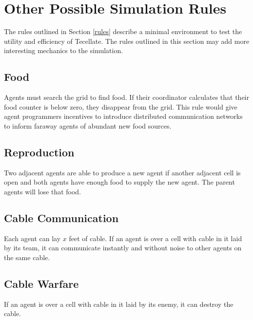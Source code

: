 \section{Other Possible Simulation Rules}

The rules outlined in Section \ref{rules} describe a minimal environment to test the utility and efficiency of Tecellate. The rules outlined in this section may add more interesting mechanics to the simulation.

\subsection{Food}

Agents must search the grid to find food. If their coordinator calculates that their food counter is below zero, they disappear from the grid. This rule would give agent programmers incentives to introduce distributed communication networks to inform faraway agents of abundant new food sources.

\subsection{Reproduction}

Two adjacent agents are able to produce a new agent if another adjacent cell is open and both agents have enough food to supply the new agent. The parent agents will lose that food.

\subsection{Cable Communication}

Each agent can lay $x$ feet of cable. If an agent is over a cell with cable in it laid by its team, it can communicate instantly and without noise to other agents on the same cable.

\subsection{Cable Warfare}

If an agent is over a cell with cable in it laid by its enemy, it can destroy the cable.